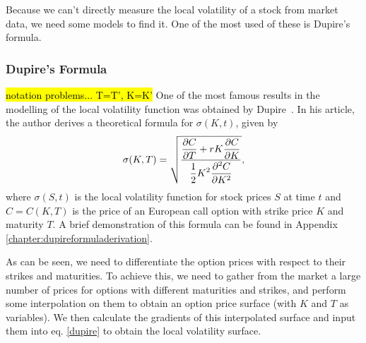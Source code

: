 Because we can't directly measure the local volatility of a stock from market data, we need some models to find it. One of the most used of these is Dupire's formula.

\subsubsection{Dupire's Formula}
\label{subsubsection:Dupire}
\hl{notation problems... T=T', K=K'}
One of the most famous results in the modelling of the local volatility function was obtained by Dupire~\cite{Dupire}. In his article, the author derives a theoretical formula for $\sigma(K,t)$, given by
\begin{equation}\label{dupire}
\sigma(K,T)=\sqrt{\frac{\displaystyle\pdv{C}{T}+rK\pdv{C}{K}}{\displaystyle\frac{1}{2}K^2\pdv{^2C}{K^2}}},
\end{equation}
\noindent where $\sigma(S,t)$ is the local volatility function for stock prices $S$ at time $t$ and $C=C(K,T)$ is the price of an European call option with strike price $K$ and maturity $T$.
A brief demonstration of this formula can be found in Appendix \ref{chapter:dupireformuladerivation}.


As can be seen, we need to differentiate the option prices with respect to their strikes and maturities. To achieve this, we need to gather from the market a large number of prices for options with different maturities and strikes, and perform some interpolation on them to obtain an option price surface (with $K$ and $T$ as variables). We then calculate the gradients of this interpolated surface and input them into eq. \ref{dupire} to obtain the local volatility surface.

